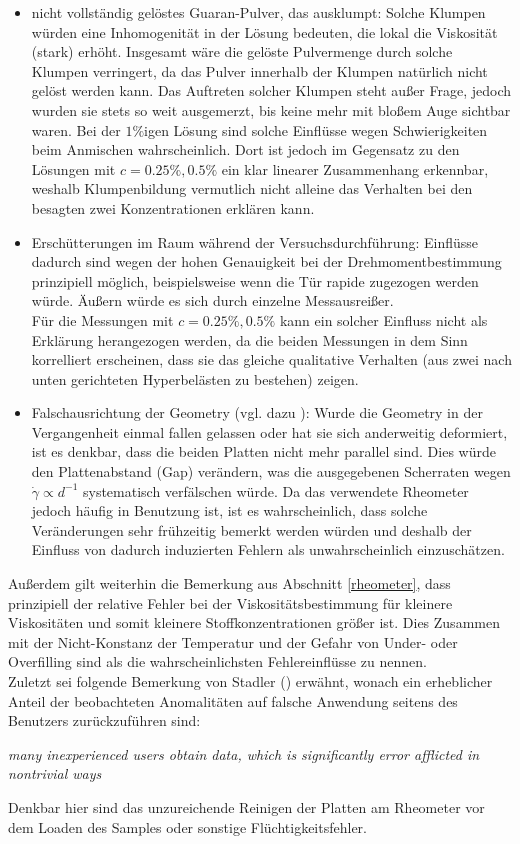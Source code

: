 \documentclass[11pt,a4paper,oneside]{scrartcl}
\begin{document}
\begin{itemize}
\item nicht vollständig gelöstes Guaran-Pulver, das ausklumpt: Solche Klumpen würden eine Inhomogenität in der Lösung bedeuten, die lokal die Viskosität (stark) erhöht. Insgesamt wäre die gelöste Pulvermenge durch solche Klumpen verringert, da das Pulver innerhalb der Klumpen natürlich nicht gelöst werden kann. Das Auftreten solcher Klumpen steht außer Frage, jedoch wurden sie stets so weit ausgemerzt, bis keine mehr mit bloßem Auge sichtbar waren. Bei der $1\%$igen Lösung sind solche Einflüsse wegen Schwierigkeiten beim Anmischen wahrscheinlich. Dort ist jedoch im Gegensatz zu den Lösungen mit $c=0.25\%,0.5\%$ ein klar linearer Zusammenhang erkennbar, weshalb Klumpenbildung vermutlich nicht alleine das Verhalten bei den besagten zwei Konzentrationen erklären kann.
\item Erschütterungen im Raum während der Versuchsdurchführung: Einflüsse dadurch sind wegen der hohen Genauigkeit bei der Drehmomentbestimmung prinzipiell möglich, beispielsweise wenn die Tür rapide zugezogen werden würde. Äußern würde es sich durch einzelne Messausreißer.\\
Für die Messungen mit $c=0.25\%,0.5\%$ kann ein solcher Einfluss nicht als Erklärung herangezogen werden, da die beiden Messungen in dem Sinn korrelliert erscheinen, dass sie das gleiche qualitative Verhalten (aus zwei nach unten gerichteten Hyperbelästen zu bestehen) zeigen.
\item Falschausrichtung der Geometry (vgl. dazu \cite{Stadler2014}): Wurde die Geometry in der Vergangenheit einmal fallen gelassen oder hat sie sich anderweitig deformiert, ist es denkbar, dass die beiden Platten nicht mehr parallel sind. Dies würde den Plattenabstand (Gap) verändern, was die ausgegebenen Scherraten wegen $\dot\gamma\propto d^{-1}$ systematisch verfälschen würde. Da das verwendete Rheometer jedoch häufig in Benutzung ist, ist es wahrscheinlich, dass solche Veränderungen sehr frühzeitig bemerkt werden würden und deshalb der Einfluss von dadurch induzierten Fehlern als unwahrscheinlich einzuschätzen.
\end{itemize}
Außerdem gilt weiterhin die Bemerkung aus Abschnitt \ref{rheometer}, dass prinzipiell der relative Fehler bei der Viskositätsbestimmung für kleinere Viskositäten und somit kleinere Stoffkonzentrationen größer ist. Dies Zusammen mit der Nicht-Konstanz der Temperatur und der Gefahr von Under- oder Overfilling sind als die wahrscheinlichsten Fehlereinflüsse zu nennen. \\
Zuletzt sei folgende Bemerkung von Stadler (\cite{Stadler2014}) erwähnt, wonach ein erheblicher Anteil der beobachteten Anomalitäten auf falsche Anwendung seitens des Benutzers zurückzuführen sind:\par
\begin{centering}
\emph{
\glqq many inexperienced users obtain data, which is significantly error afflicted in nontrivial ways\grqq
}\\
\end{centering}
\par
Denkbar hier sind das unzureichende Reinigen der Platten am Rheometer vor dem Loaden des Samples oder sonstige Flüchtigkeitsfehler.
\end{document}
